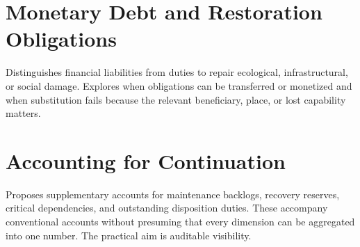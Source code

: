 \chapter{Monetary Debt and Restoration Obligations}\label{ch:19}
Distinguishes financial liabilities from duties to repair ecological, infrastructural, or social damage. Explores when obligations can be transferred or monetized and when substitution fails because the relevant beneficiary, place, or lost capability matters.
\scaffold

\chapter{Accounting for Continuation}\label{ch:20}
Proposes supplementary accounts for maintenance backlogs, recovery reserves, critical dependencies, and outstanding disposition duties. These accompany conventional accounts without presuming that every dimension can be aggregated into one number. The practical aim is auditable visibility.
\scaffold
